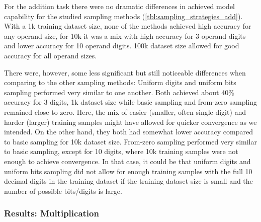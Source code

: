 For the addition task there were no dramatic differences in achieved model capability for the studied sampling methods  (\cref{tbl:sampling_strategies_add}). With a 1k training dataset size, none of the methods achieved high accuracy for any operand size, for 10k it was a mix with high accuracy for 3 operand digits and lower accuracy for 10 operand  digits. 100k dataset size allowed for good accuracy for all operand sizes.

There were, however, some less significant but still noticeable differences when comparing to the other sampling methods: Uniform digits and uniform bits sampling performed very similar to one another. Both achieved about 40\% accuracy for 3 digits, 1k dataset size while basic sampling and from-zero sampling remained close to zero. Here, the mix of easier (smaller, often single-digit) and harder (larger) training samples might have allowed for quicker convergence as we intended. On the other hand, they both had somewhat lower accuracy compared to basic sampling for 10k dataset size. From-zero sampling performed very similar to basic sampling,  except for 10 digits, where 10k training samples were not enough to achieve convergence. In that case, it could be that uniform digits and uniform bits sampling did not allow for enough training samples with the full 10 decimal digits in the training dataset if the training dataset size is small and the number of possible bits/digits is large.


\subsubsection{Results: Multiplication}

\begin{table}[H]
    \begin{minipage}[t]{0.47\linewidth}
        \hfill
    \end{minipage}
    \hfill
    \begin{minipage}[t]{0.47\linewidth}
        \hfill
    \end{minipage}

    \vspace{0.5cm}
    \begin{minipage}[t]{0.47\linewidth}
        \hfill
    \end{minipage}
    \hfill
    \begin{minipage}[t]{0.47\linewidth}
        \hfill
    \end{minipage}
    \label{tbl:sampling_strategies_mul}
\end{table}

